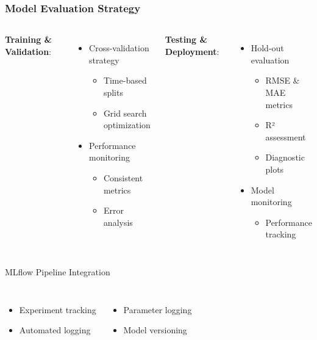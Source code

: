 \documentclass{beamer}
\begin{document}
\begin{frame}
\frametitle{Model Evaluation Strategy}
    \begin{columns} %
        \textbf{Training \& Validation}:
            \begin{itemize}
            \item Cross-validation strategy
                \begin{itemize}
                \item Time-based splits
                \item Grid search optimization
                \end{itemize}
            \item Performance monitoring
                \begin{itemize}
                \item Consistent metrics
                \item Error analysis
                \end{itemize}
            \end{itemize}
            
        \textbf{Testing \& Deployment}:
            \begin{itemize}
            \item Hold-out evaluation
                \begin{itemize}
                \item RMSE \& MAE metrics
                \item R² assessment
                \item Diagnostic plots
                \end{itemize}
            \item Model monitoring
                \begin{itemize}
                \item Performance tracking
                \end{itemize}
            \end{itemize}
    \end{columns}

    \begin{alertblock}{MLflow Pipeline Integration}
        \begin{columns}[T]
            \begin{itemize}
            \item Experiment tracking
            \item Automated logging
            \end{itemize}
            
            \begin{itemize}
            \item Parameter logging
            \item Model versioning
            \end{itemize}
        \end{columns}
    \end{alertblock}
\end{frame}
\end{document}

